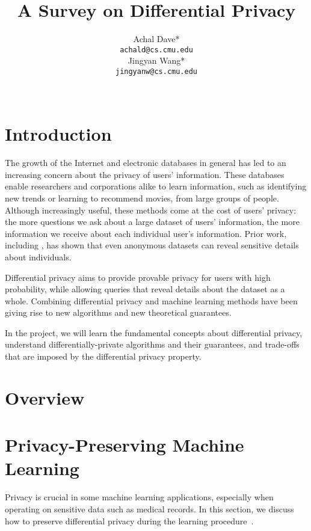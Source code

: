 \documentclass{article} %
\title{A Survey on Differential Privacy}
\author{
Achal Dave* \\
\texttt{achald@cs.cmu.edu} \\
\And
Jingyan Wang* \\
\texttt{jingyanw@cs.cmu.edu} \\
\\
}
\begin{document}
\maketitle

\section{Introduction}
The growth of the Internet and electronic databases in general has led to an
increasing concern about the privacy of users' information. These databases
enable researchers and corporations alike to learn information, such as
identifying new trends or learning to recommend movies, from large
groups of people. Although increasingly useful, these methods come at the cost
of users' privacy: the more questions we ask about a large dataset of users'
information, the more information we receive about each individual user's
information. Prior work, including \cite{narayanan2008robust,
sweeney1997weaving, ganta2008composition}, has shown that even anonymous
datasets can reveal sensitive details about individuals.

Differential privacy aims to provide provable privacy for users with high probability, while allowing queries that reveal details about the dataset as a whole. Combining differential privacy and machine learning methods have been giving rise to new algorithms and new theoretical guarantees.

In the project, we will learn the fundamental concepts about differential privacy, understand differentially-private algorithms and their guarantees, and trade-offs that are imposed by the differential privacy property.


\section{Overview}\label{overview}

\section{Privacy-Preserving Machine Learning}
Privacy is crucial in some machine learning applications, especially when operating on sensitive data such as medical records. In this section, we discuss how to preserve differential privacy during the learning procedure~\cite{chaudhuri2011erm}.
\end{document}
